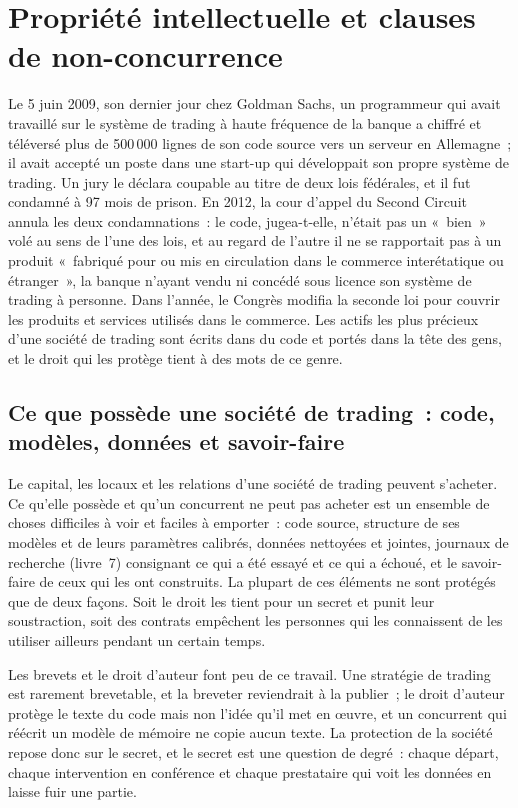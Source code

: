 \chapter{Propriété intellectuelle et clauses de non-concurrence}\label{ch:fm:intellectual-property-and-non-competes}

Le 5 juin 2009, son dernier jour chez Goldman Sachs, un programmeur qui avait travaillé sur le système de trading à haute fréquence de la banque a chiffré et téléversé
plus de 500\,000 lignes de son code source vers un serveur en Allemagne~; il avait accepté un poste dans une start-up qui développait son propre système de trading. Un jury
le déclara coupable au titre de deux lois fédérales, et il fut condamné à 97 mois de prison. En 2012, la cour d'appel du Second Circuit annula
les deux condamnations~: le code, jugea-t-elle, n'était pas un «~bien~» volé au sens de l'une des lois, et au regard de l'autre il ne se rapportait pas à un produit «~fabriqué
pour ou mis en circulation dans le commerce interétatique ou étranger~», la banque n'ayant vendu ni concédé sous licence son système de trading à personne. Dans l'année, le Congrès
modifia la seconde loi pour couvrir les produits et services utilisés dans le commerce. Les actifs les plus précieux d'une société de trading sont écrits dans du code et
portés dans la tête des gens, et le droit qui les protège tient à des mots de ce genre.

\section{Ce que possède une société de trading~: code, modèles, données et savoir-faire}

Le capital, les locaux et les relations d'une société de trading peuvent s'acheter. Ce qu'elle possède et qu'un concurrent ne peut pas acheter est un ensemble de choses difficiles à voir
et faciles à emporter~: code source, structure de ses modèles et de leurs paramètres calibrés, données nettoyées et jointes, journaux de recherche (livre~7)
consignant ce qui a été essayé et ce qui a échoué, et le savoir-faire de ceux qui les ont construits. La plupart de ces éléments ne sont protégés que de deux façons. Soit le droit
les tient pour un secret et punit leur soustraction, soit des contrats empêchent les personnes qui les connaissent de les utiliser ailleurs pendant un certain temps.

Les brevets et le droit d'auteur font peu de ce travail. Une stratégie de trading est rarement brevetable, et la breveter reviendrait à la publier~; le droit d'auteur protège le
texte du code mais non l'idée qu'il met en œuvre, et un concurrent qui réécrit un modèle de mémoire ne copie aucun texte. La protection de la société repose donc sur
le secret, et le secret est une question de degré~: chaque départ, chaque intervention en conférence et chaque prestataire qui voit les données en laisse fuir une partie.

